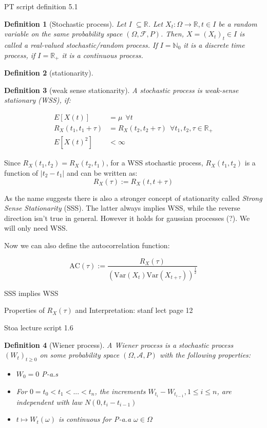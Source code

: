 \documentclass[%
thesis=student,%
coverpage=false,%
titlepage=false,%
headmarks=true, %
german,%
font=libertine, %
math=newpxtx, %
BCOR=5mm,%
coverBCOR=11mm%
]{tumbook}
\newtheorem{definition}{Definition}[section]
\begin{document}
PT script definition 5.1
\begin{definition}[Stochastic process]
Let I $\subseteq \mathbb{R}$. Let $X_{t}:\Omega \rightarrow \mathbb{R}, t \in I$ be a random variable on the same probability space $(\Omega,\mathcal{F},P)$. Then, $X = (X_{t})_{t} \in I$ is called a real-valued stochastic/random process. If $I = \mathbb{N}_{0}$ it is a discrete time process, if  $I = \mathbb{R}_{+}$ it is a continuous process.
\end{definition}

\begin{definition}[stationarity]
    
\end{definition}


\begin{definition}[weak sense stationarity]
A stochastic process is weak-sense stationary (WSS), if:

\begin{subequations}
    \begin{align}
        E[X(t)] &= \mu \ \ \forall t \\
        R_{X}(t_{1},t_{1} + \tau) &= R_{X}(t_{2},t_{2} + \tau) \ \ \forall t_{1},t_{2},\tau \in \mathbb{R}_{+} \\
        E[X(t)^2]&<\infty
    \end{align}
\end{subequations}   
\end{definition}

Since $R_{X}(t_{1},t_{2}) = R_{X}(t_{2},t_{1})$, for a WSS stochastic process, $R_{X}(t_{1},t_{2})$ is a function of $\lvert t_{2} - t_{1} \rvert$ and can be written as:
\[
R_{X}(\tau) := R_{X}(t,t + \tau)
\]

As the name suggests there is also a stronger concept of stationarity called \textit{Strong Sense Stationarity} (SSS). The latter always implies WSS, while the reverse direction isn't true in general. However it holds for gaussian processes (?). We will only need WSS.

Now we can also define the autocorrelation function:


\[
\text{AC}(\tau) := \frac{R_{X}(\tau)}{(\text{Var}(X_{t})\text{Var}(X_{t+\tau}))^{\frac{1}{2}}}
\]

SSS implies WSS

Properties of $R_{X}(\tau)$ and Interpretation: stanf lect page 12

Stoa lecture script 1.6
\begin{definition}[Wiener process]
A Wiener process is a stochastic process $(W_{t})_{t\geq 0}$ on some probability space $(\Omega,\mathcal{A},P)$ with the following properties: 
\begin{itemize}
    \item $W_{0} = 0$ P-a.s
    \item For $0 = t_{0} < t_{1} < ... < t_{n}$, the increments $W_{t_{i}} - W_{t_{i-1}}, 1 \leq i \leq n$, are independent with law $N(0,t_{i}-t_{i-1})$
    \item $t \mapsto W_{t}(\omega)$ is continuous for P-a.a $\omega \in \Omega$
\end{itemize}
\end{definition}
\end{document}
